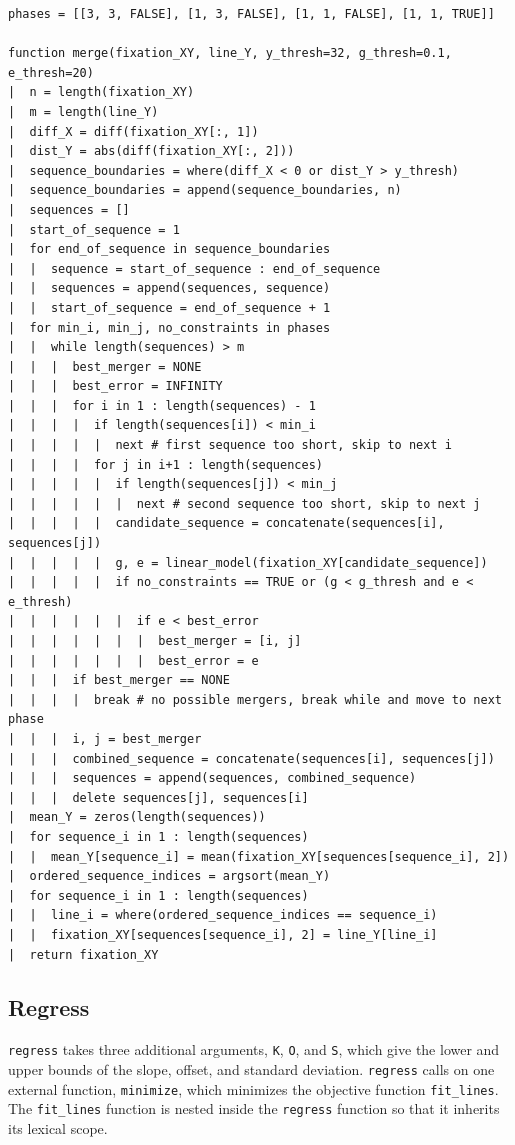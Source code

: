 \documentclass[doc,biblatex]{apa7}
\begin{document}
\begin{verbatim}
phases = [[3, 3, FALSE], [1, 3, FALSE], [1, 1, FALSE], [1, 1, TRUE]]

function merge(fixation_XY, line_Y, y_thresh=32, g_thresh=0.1, e_thresh=20)
|  n = length(fixation_XY)
|  m = length(line_Y)
|  diff_X = diff(fixation_XY[:, 1])
|  dist_Y = abs(diff(fixation_XY[:, 2]))
|  sequence_boundaries = where(diff_X < 0 or dist_Y > y_thresh)
|  sequence_boundaries = append(sequence_boundaries, n)
|  sequences = []
|  start_of_sequence = 1
|  for end_of_sequence in sequence_boundaries
|  |  sequence = start_of_sequence : end_of_sequence
|  |  sequences = append(sequences, sequence)
|  |  start_of_sequence = end_of_sequence + 1
|  for min_i, min_j, no_constraints in phases
|  |  while length(sequences) > m
|  |  |  best_merger = NONE
|  |  |  best_error = INFINITY
|  |  |  for i in 1 : length(sequences) - 1
|  |  |  |  if length(sequences[i]) < min_i
|  |  |  |  |  next # first sequence too short, skip to next i
|  |  |  |  for j in i+1 : length(sequences)
|  |  |  |  |  if length(sequences[j]) < min_j
|  |  |  |  |  |  next # second sequence too short, skip to next j
|  |  |  |  |  candidate_sequence = concatenate(sequences[i], sequences[j])
|  |  |  |  |  g, e = linear_model(fixation_XY[candidate_sequence])
|  |  |  |  |  if no_constraints == TRUE or (g < g_thresh and e < e_thresh)
|  |  |  |  |  |  if e < best_error
|  |  |  |  |  |  |  best_merger = [i, j]
|  |  |  |  |  |  |  best_error = e
|  |  |  if best_merger == NONE
|  |  |  |  break # no possible mergers, break while and move to next phase
|  |  |  i, j = best_merger
|  |  |  combined_sequence = concatenate(sequences[i], sequences[j])
|  |  |  sequences = append(sequences, combined_sequence)
|  |  |  delete sequences[j], sequences[i]
|  mean_Y = zeros(length(sequences))
|  for sequence_i in 1 : length(sequences)
|  |  mean_Y[sequence_i] = mean(fixation_XY[sequences[sequence_i], 2])
|  ordered_sequence_indices = argsort(mean_Y)
|  for sequence_i in 1 : length(sequences)
|  |  line_i = where(ordered_sequence_indices == sequence_i)
|  |  fixation_XY[sequences[sequence_i], 2] = line_Y[line_i]
|  return fixation_XY
\end{verbatim}

\subsection{Regress}

\texttt{regress} takes three additional arguments, \texttt{K}, \texttt{O}, and \texttt{S}, which give the lower and upper bounds of the slope, offset, and standard deviation. \texttt{regress} calls on one external function, \texttt{minimize}, which minimizes the objective function \texttt{fit\_lines}. The \texttt{fit\_lines} function is nested inside the \texttt{regress} function so that it inherits its lexical scope.
\end{document}
